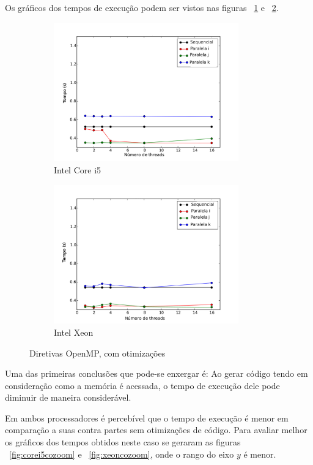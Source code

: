 \documentclass[a4paper,12pt,fleqn]{article}
\begin{document}
Os gráficos dos tempos de execução podem ser vistos nas figuras ~\ref{fig:corei5co} e ~\ref{fig:xeonco}. 

\begin{figure} 
    \centering
    \begin{subfigure}{.5\textwidth}
        \centering
        \includegraphics[height=6cm]{Images/corei5co} 
        \caption{Intel Core i5}
        \label{fig:corei5co} 
    \end{subfigure}%
    \begin{subfigure}{.5\textwidth}
        \centering
        \includegraphics[height=6cm]{Images/xeonco} 
        \caption{Intel Xeon}
        \label{fig:xeonco} 
    \end{subfigure}    
    \caption{Diretivas OpenMP, com otimizações}
    \label{fig:co}
\end{figure} 

Uma das primeiras conclusões que pode-se enxergar é: Ao gerar código tendo em consideração como a memória é acessada, o tempo de execução dele pode diminuir de maneira considerável. 

Em ambos processadores é percebível que o tempo de execução é menor em comparação a suas contra partes sem otimizações de código. Para avaliar melhor os gráficos dos tempos obtidos neste caso se geraram as figuras ~\ref{fig:corei5cozoom} e ~\ref{fig:xeoncozoom}, onde o rango do eixo $y$ é menor. 
\end{document}
